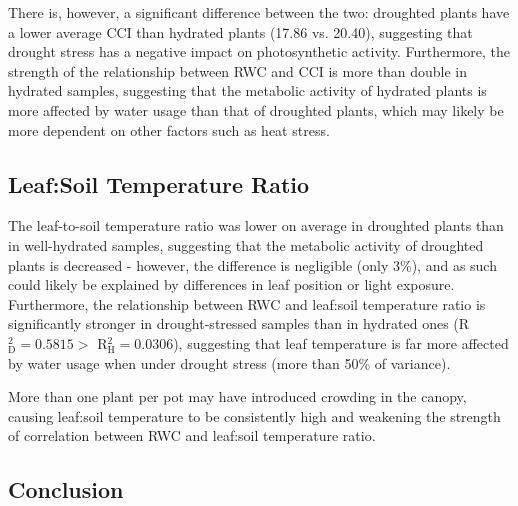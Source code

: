 \documentclass{report}
\begin{document}
\hspace{24pt}There is, however, a significant difference between the two: droughted plants have a lower average CCI than hydrated plants (17.86 vs. 20.40), suggesting that drought stress has a negative impact on photosynthetic activity. Furthermore, the strength of the relationship between RWC and CCI is more than double in hydrated samples, suggesting that the metabolic activity of hydrated plants is more affected by water usage than that of droughted plants, which may likely be more dependent on other factors such as heat stress.

\subsection*{Leaf:Soil Temperature Ratio}

\hspace{24pt}The leaf-to-soil temperature ratio was lower on average in droughted plants than in well-hydrated samples, suggesting that the metabolic activity of droughted plants is decreased - however, the difference is negligible (only 3\%), and as such could likely be explained by differences in leaf position or light exposure. Furthermore, the relationship between RWC and leaf:soil temperature ratio is significantly stronger in drought-stressed samples than in hydrated ones (R${}^{2}_{\text{D}} = 0.5815 >$ R${}^{2}_{\text{H}} = 0.0306$), suggesting that leaf temperature is far more affected by water usage when under drought stress (more than 50\% of variance).

\hspace{24pt}More than one plant per pot may have introduced crowding in the canopy, causing leaf:soil temperature to be consistently high and weakening the strength of correlation between RWC and leaf:soil temperature ratio.


\subsection*{Conclusion}
\end{document}
